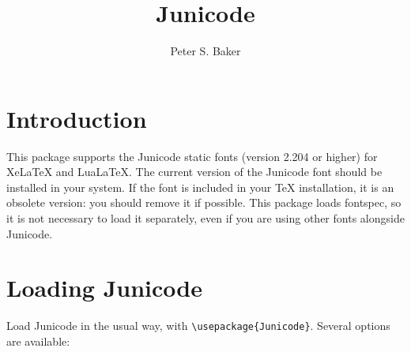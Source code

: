 \documentclass{article}
\title{Junicode}
\author{Peter S. Baker}
\date{}
\begin{document}
\maketitle

\section{Introduction}

This package supports the Junicode static fonts (version 2.204 or higher)
for XeLaTeX and LuaLaTeX. The current version of the Junicode font should
be installed in your system. If the font is included in your TeX installation,
it is an obsolete version: you should remove it if possible. This package loads
fontspec, so it is not necessary to load it separately, even if you are using
other fonts alongside Junicode.

\section{Loading Junicode}

Load Junicode in the usual way, with {\small\verb|\usepackage{Junicode}|}. Several options are available:
\end{document}
